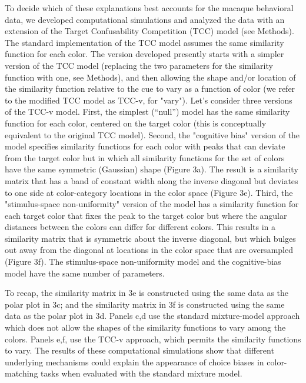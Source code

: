 To decide which of these explanations best accounts for the macaque behavioral data, we developed computational simulations and analyzed the data with an extension of the Target Confusability Competition (TCC) model \citep{schurgin_psychophysical_2020} (see Methods). 
The standard implementation of the TCC model assumes the same similarity function for each color. The version developed presently starts with a simpler version of the TCC model (replacing the two parameters for the similarity function with one, see Methods), and then allowing the shape and/or location of the similarity function relative to the cue to vary as a function of color (we refer to the modified TCC model as TCC-v, for "vary"). Let's consider three versions of the TCC-v model. First, the simplest (“null”) model has the same similarity function for each color, centered on the target color (this is conceptually equivalent to the original TCC model). Second, the "cognitive bias" version of the model specifies similarity functions for each color with peaks that can deviate from the target color but in which all similarity functions for the set of colors have the same symmetric (Gaussian) shape (Figure 3a). The result is a similarity matrix that has a band of constant width along the inverse diagonal but deviates to one side at color-category locations in the color space (Figure 3e). Third, the "stimulus-space non-uniformity" version of the model has a similarity function for each target color that fixes the peak to the target color but where the angular distances between the colors can differ for different colors. This results in a similarity matrix that is symmetric about the inverse diagonal, but which bulges out away from the diagonal at locations in the color space that are oversampled (Figure 3f). The stimulus-space non-uniformity model and the cognitive-bias model have the same number of parameters. 

To recap, the similarity matrix in 3e is constructed using the same data as the polar plot in 3c; and the similarity matrix in 3f is constructed using the same data as the polar plot in 3d. Panels c,d use the standard mixture-model approach which does not allow the shapes of the similarity functions to vary among the colors. Panels e,f, use the TCC-v approach, which permits the similarity functions to vary. The results of these computational simulations show that different underlying mechanisms could explain the appearance of choice biases in color-matching tasks when evaluated with the standard mixture model.

